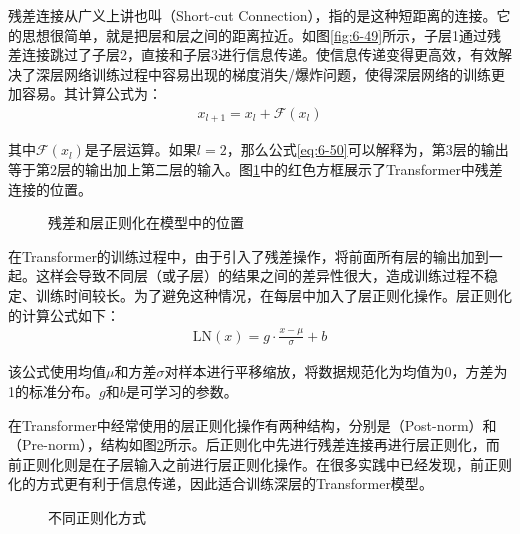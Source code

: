 \parinterval 残差连接从广义上讲也叫{\small{}}（Short-cut Connection），指的是这种短距离的连接。它的思想很简单，就是把层和层之间的距离拉近。如图\ref{fig:6-49}所示，子层1通过残差连接跳过了子层2，直接和子层3进行信息传递。使信息传递变得更高效，有效解决了深层网络训练过程中容易出现的梯度消失/爆炸问题，使得深层网络的训练更加容易。其计算公式为：
\begin{eqnarray}
x_{l+1} = x_l + \mathcal{F} (x_l)
\label{eq:6-50}
\end{eqnarray}

\noindent 其中$\mathcal{F} (x_l)$是子层运算。如果$l=2$，那么公式\ref{eq:6-50}可以解释为，第3层的输出等于第2层的输出加上第二层的输入。图\ref{fig:6-50}中的红色方框展示了Transformer中残差连接的位置。

\begin{figure}[htp]
\centering

\caption{残差和层正则化在模型中的位置}
\label{fig:6-50}
\end{figure}

\parinterval 在Transformer的训练过程中，由于引入了残差操作，将前面所有层的输出加到一起。这样会导致不同层（或子层）的结果之间的差异性很大，造成训练过程不稳定、训练时间较长。为了避免这种情况，在每层中加入了层正则化操作\cite{Ba2016LayerN}。层正则化的计算公式如下：
\begin{eqnarray}
\textrm{LN}(x) = g \cdot \frac{x- \mu} {\sigma} + b
\label{eq:6-51}
\end{eqnarray}

\noindent 该公式使用均值$\mu$和方差$\sigma$对样本进行平移缩放，将数据规范化为均值为0，方差为1的标准分布。$g$和$b$是可学习的参数。

\parinterval 在Transformer中经常使用的层正则化操作有两种结构，分别是{\small{}}（Post-norm）和{\small{}}（Pre-norm），结构如图\ref{fig:6-51}所示。后正则化中先进行残差连接再进行层正则化，而前正则化则是在子层输入之前进行层正则化操作。在很多实践中已经发现，前正则化的方式更有利于信息传递，因此适合训练深层的Transformer模型\cite{WangLearning}。

\begin{figure}[htp]
\centering

\caption{不同正则化方式 }
\label{fig:6-51}
\end{figure}

